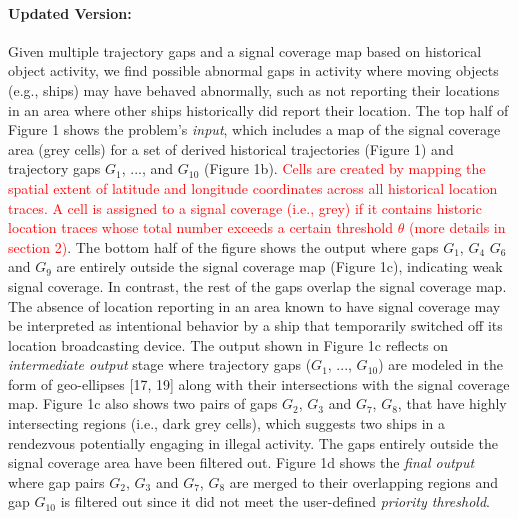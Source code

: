 \documentclass[twoside,leqno,onecolumn]{article}
\begin{document}
\paragraph{Updated Version: } Given multiple trajectory gaps and a signal coverage map based on historical object activity, we find possible abnormal gaps in activity where moving objects (e.g., ships) may have behaved abnormally, such as not reporting their locations in an area where other ships historically did report their location. The top half of Figure 1 shows the problem's \textit{input}, which includes a map of the signal coverage area (grey cells) for a set of derived historical trajectories (Figure  1) and trajectory gaps $G_{1}$, ..., and $G_{10}$ (Figure 1b). \textcolor{red}{Cells are created by mapping the spatial extent of latitude and longitude coordinates across all historical location traces. A cell is assigned to a signal coverage (i.e., grey) if it contains historic location traces whose total number exceeds a certain threshold $\theta$ (more details in section 2)}. The bottom half of the figure shows the output where gaps $G_{1}$, $G_{4}$ $G_{6}$ and $G_{9}$ are entirely outside the signal coverage map (Figure 1c), indicating weak signal coverage. In contrast, the rest of the gaps overlap the signal coverage map. The absence of location reporting in an area known to have signal coverage may be interpreted as intentional behavior by a ship that temporarily switched off its location broadcasting device. The output shown in Figure 1c reflects on \textit{intermediate output} stage where trajectory gaps ($G_{1}$, ..., $G_{10}$) are modeled in the form of geo-ellipses [17, 19] along with their intersections with the signal coverage map. Figure 1c also shows two pairs of gaps $G_{2}$, $G_{3}$ and $G_{7}$, $G_{8}$, that have highly intersecting regions (i.e., dark grey cells), which suggests two ships in a rendezvous potentially engaging in illegal activity. The gaps entirely outside the signal coverage area have been filtered out. Figure 1d shows the \textit{final output} where gap pairs $G_{2}$, $G_{3}$ and $G_{7}$, $G_{8}$ are merged to their overlapping regions and gap $G_{10}$ is filtered out since it did not meet the user-defined \textit{priority threshold}.



\end{document}

